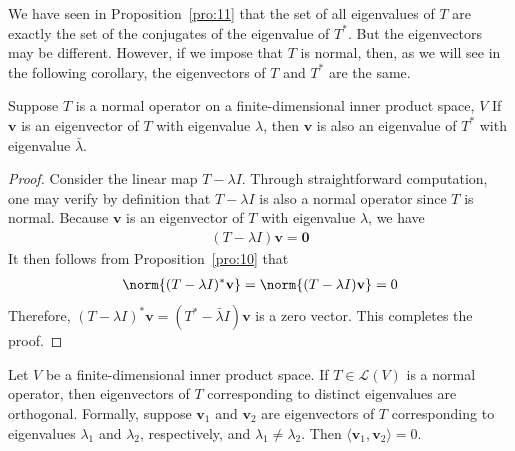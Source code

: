 \documentclass[thmcnt=section, color=blue, 12pt]{my-elegantbook}
\begin{document}

We have seen in Proposition~\ref{pro:11} that
the set of all eigenvalues of $T$ 
are exactly the set of the conjugates of the eigenvalue of $T^\ast$. 
But the eigenvectors may be different.
However, if we impose that $T$ is normal, 
then, as we will see in the following corollary,
the eigenvectors of $T$ and $T^\ast$ are the same.

\begin{corollary} \label{cor:9}
	Suppose $T$ is a normal operator on a 
	finite-dimensional inner product space, $V$
	If $\mathbf{v}$ is an eigenvector of $T$ with eigenvalue $\lambda$,
	then $\mathbf{v}$ is also an eigenvalue of $T^\ast$ 
	with eigenvalue $\bar{\lambda}$.
\end{corollary}

\begin{proof}
	Consider the linear map $T - \lambda I$.
	Through straightforward computation,
	one may verify by definition 
	that $T - \lambda I$ is also a normal operator
	since $T$ is normal.
	Because $\mathbf{v}$ is an eigenvector of $T$ with eigenvalue $\lambda$,
	we have 
	\begin{align*}
		(T - \lambda I)\mathbf{v} = \mathbf{0}
	\end{align*}
	It then follows from Proposition~\ref{pro:10}
	that 
	\begin{align*}
		\norm{(T - \lambda I)^\ast \mathbf{v}}
		= \norm{(T - \lambda I)\mathbf{v}}
		= 0
	\end{align*}
	Therefore, $(T - \lambda I)^\ast \mathbf{v} = (T^\ast - \bar{\lambda} I) \mathbf{v}$ is a zero vector.
	This completes the proof.
\end{proof}


\begin{corollary} \label{cor:10}
	Let $V$ be a finite-dimensional inner product space.
	If $T \in \mathcal{L}(V)$ is a normal operator, 
	then eigenvectors of $T$ corresponding to distinct
	eigenvalues are orthogonal.
	Formally, suppose $\mathbf{v}_1$ and $\mathbf{v}_2$
	are eigenvectors of $T$ corresponding to 
	eigenvalues $\lambda_1$ and $\lambda_2$, respectively,
	and $\lambda_1 \neq \lambda_2$.
	Then $\langle \mathbf{v}_1, \mathbf{v}_2 \rangle = 0$.
\end{corollary}
\end{document}
